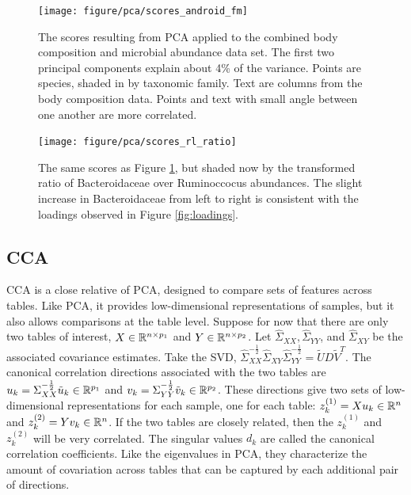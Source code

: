 \documentclass[14pt]{extarticle}
\begin{document}
\begin{figure}
  \centering
  \texttt{[image: figure/pca/scores\_android\_fm]}
  \caption{The scores resulting from PCA applied to the combined body
    composition and microbial abundance data set. The first two principal
    components explain about 4\% of the variance. Points are species, shaded in by
    taxonomic family. Text are columns from the body composition data. Points
    and text with small angle between one another are more correlated.
    \label{fig:scores_android_fm} }
\end{figure}

\begin{figure}
  \centering
  \texttt{[image: figure/pca/scores\_rl\_ratio]}
  \caption{The same scores as Figure \ref{fig:scores_android_fm}, but shaded now
    by the transformed ratio of Bacteroidaceae over Ruminoccocus abundances. The
    slight increase in Bacteroidaceae from left to right is consistent with the
    loadings observed in Figure \ref{fig:loadings}.\label{fig:scores_rl_ratio} }
\end{figure}

\subsection{CCA}
\label{subsec:cca}

CCA is a close relative of PCA, designed to compare sets of features across
tables. Like PCA, it provides low-dimensional representations of samples, but it
also allows comparisons at the table level. Suppose for now that there are only
two tables of interest, $X \in \mathbb{R}^{n \times p_{1}}$ and $Y \in \mathbb{R}^{n
  \times p_{2}}$. Let $\hat{\Sigma}_{XX}, \hat{\Sigma}_{YY}$, and
$\hat{\Sigma}_{XY}$ be the associated covariance estimates. Take the SVD,
$\hat{\Sigma}_{XX}^{-\frac{1}{2}}\hat{\Sigma}_{XY}\hat{\Sigma}_{YY}^{-\frac{1}{2}}
= \tilde{U}D\tilde{V}^{T}$. The canonical correlation directions associated with
the two tables are $u_{k} = \Sigma_{XX}^{-\frac{1}{2}}\tilde{u}_{k} \in
\mathbb{R}^{p_{1}}$ and $v_{k} = \Sigma_{YY}^{-\frac{1}{2}}\tilde{v}_{k} \in
\mathbb{R}^{p_{2}}$. These directions give two sets of low-dimensional
representations for each sample, one for each table: $z_{k}^{(1)} = Xu_{k} \in
\mathbb{R}^{n}$ and $z_{k}^{(2)} = Yv_{k} \in \mathbb{R}^{n}$. If the two tables are
closely related, then the $z_{k}^{(1)}$ and $z_{k}^{(2)}$ will be very
correlated. The singular values $d_{k}$ are called the canonical correlation
coefficients. Like the eigenvalues in PCA, they characterize the amount of
covariation across tables that can be captured by each additional pair of
directions.
\end{document}
